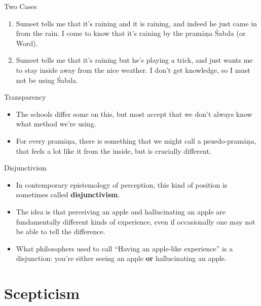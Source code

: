\documentclass[
  17pt,
  letterpaper,
  ignorenonframetext,
  aspectratio=169,
]{beamer}
\providecommand{\tightlist}{%
  \setlength{\itemsep}{0pt}\setlength{\parskip}{0pt}}\usepackage{longtable,booktabs,array}
\begin{document}
\begin{frame}{Two Cases}
\protect\hypertarget{two-cases}{}
\begin{enumerate}[<+->]
\tightlist
\item
  Sumeet tells me that it's raining and it is raining, and indeed he
  just came in from the rain. I come to know that it's raining by the
  pramāṇa Śabda (or Word).
\item
  Sumeet tells me that it's raining but he's playing a trick, and just
  wants me to stay inside away from the nice weather. I don't get
  knowledge, so I must not be using Śabda.
\end{enumerate}
\end{frame}

\begin{frame}{Transparency}
\protect\hypertarget{transparency}{}
\begin{itemize}[<+->]
\tightlist
\item
  The schools differ some on this, but most accept that we don't always
  know what method we're using.
\item
  For every pramāṇa, there is something that we might call a
  psuedo-pramāṇa, that feels a lot like it from the inside, but is
  crucially different.
\end{itemize}
\end{frame}

\begin{frame}{Disjunctivism}
\protect\hypertarget{disjunctivism}{}
\begin{itemize}[<+->]
\tightlist
\item
  In contemporary epistemology of perception, this kind of position is
  sometimes called \textbf{disjunctivism}.
\item
  The idea is that perceiving an apple and hallucinating an apple are
  fundamentally different kinds of experience, even if occasionally one
  may not be able to tell the difference.
\item
  What philosophers used to call ``Having an apple-like experience'' is
  a disjunction: you're either seeing an apple \textbf{or} hallucinating
  an apple.
\end{itemize}
\end{frame}

\hypertarget{scepticism}{%
\section{Scepticism}\label{scepticism}}
\end{document}
